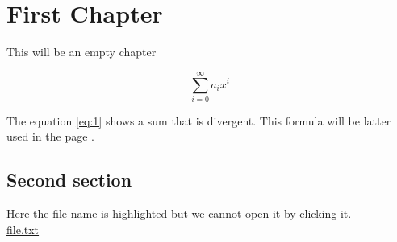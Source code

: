 \documentclass{book}
\begin{document}
\frontmatter
\tableofcontents
\clearpage

\chapter{First Chapter}

This will be an empty chapter

\begin{equation}
\label{eq:1}
\sum_{i=0}^{\infty} a_i x^i
\end{equation}

The equation \ref{eq:1} shows a sum that is divergent. This formula will be latter used in the page \pageref{second}.

\clearpage

\section{Second section} \label{second}

Here the file name is highlighted but we cannot open it by clicking it.\\
\href{run:./file.txt}{file.txt}
\end{document}
